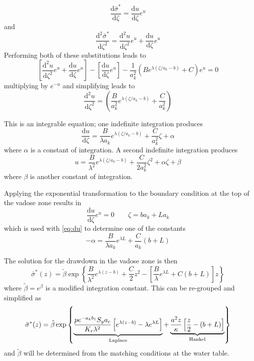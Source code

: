 \documentclass[11pt]{article}
\begin{document}
$$\frac{\mathrm{d}\bar{\sigma}^{\ast}}{\mathrm{d}\zeta} =
\frac{\mathrm{d}u}{\mathrm{d}\zeta}e^u$$ 
and
$$\frac{\mathrm{d}^2\bar{\sigma}^{\ast}}{\mathrm{d}\zeta^2} =
\frac{\mathrm{d}^2u}{\mathrm{d}\zeta^2}e^u +
\frac{\mathrm{d}u}{\mathrm{d}\zeta}e^u$$
Performing both of these substitutions leads to
$$ \left[ \frac{\mathrm{d}^2u}{\mathrm{d}\zeta^2}e^u +
  \frac{\mathrm{d}u}{\mathrm{d}\zeta}e^u \right]-  \left[
  \frac{\mathrm{d}u}{\mathrm{d}\zeta}e^u \right]- \frac{1}{a_k^2}\left( B e^{\lambda (\zeta/a_k-b)} + C\right) e^{u}=0$$
multiplying by $e^{-u}$ and simplifying leads to
\begin{equation}
  \label{eq:expsubODE}
   \frac{\mathrm{d}^2 u}{\mathrm{d}\zeta^2} = \left( \frac{B}{a_k^2} e^{\lambda (\zeta/a_k-b)} + \frac{C}{a_k^2}\right) 
\end{equation}

This is an integrable equation; one indefinite integration produces
\begin{equation}
  \label{eq:du}
  \frac{\mathrm{d} u}{\mathrm{d}\zeta} =  \frac{B}{\lambda a_k} e^{\lambda (\zeta/a_k-b)} + \frac{C}{a_k^2}\zeta + \alpha
\end{equation}
where $\alpha$ is a constant of integration. A second indefinite integration produces
$$ u =  \frac{B}{\lambda^2} e^{\lambda (\zeta/a_k-b)} + \frac{C}{2a_k^2}\zeta^2 + \alpha\zeta + \beta  $$
where $\beta$ is another constant of integration.  

Applying the exponential transformation to the boundary condition at the top of the vadose zone results in
$$\frac{\mathrm{d}u}{\mathrm{d}\zeta} e^u=0 \qquad \zeta=ba_k + La_k$$
which is used with \eqref{eq:du} to determine one of the constants
$$-\alpha= \frac{B}{\lambda a_k} e^{\lambda L} + \frac{C}{a_k} \left( b+L\right) $$

The solution for the drawdown in the vadose zone is then
\begin{equation}
  \nonumber
  \bar{\sigma}^{\ast} (z) = \tilde{\beta}\exp\left\{ \frac{B}{\lambda^2} e^{\lambda (z-b)} + \frac{C}{2}z^2 -\left[\frac{B}{\lambda} e^{\lambda L} + C \left( b+L\right)\right]z  \right\}
\end{equation}
where $\tilde{\beta}=e^\beta$ is a modified integration constant. This can be re-grouped and simplified as
\begin{equation}
  \label{eq:sigma}
  \bar{\sigma}^{\ast} (z) = \tilde{\beta}\exp\left\{  \underbrace{\frac{p e^{-a_k b_1} S_y a_c} {K_r \lambda^2} \left[ e^{\lambda (z-b)}  - \lambda e^{\lambda L} \right]}_{\rm Laplace} + \underbrace{\frac{a^2 z}{\kappa}\left[\frac{z}{2} - \left( b+L\right) \right]}_{\rm Hankel}  \right\}
\end{equation}
and $\tilde{\beta}$ will be determined from the matching conditions at the water table.
\end{document}
